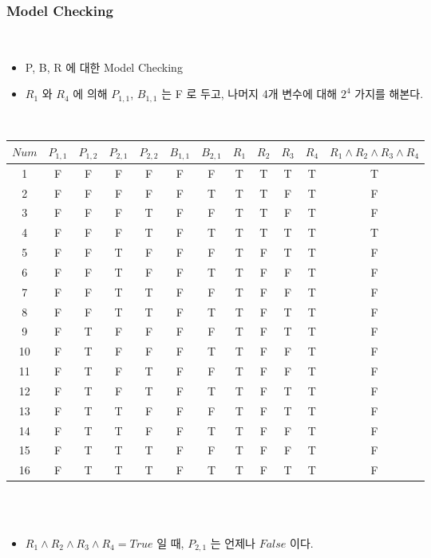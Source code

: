 \documentclass[a4paper]{article}
\begin{document}
\subsubsection{Model Checking} %
~~~~~~\begin{itemize}
    \item P, B, R 에 대한 Model Checking
    \item $R_1$ 와 $R_4$ 에 의해 $P_{1, 1}$, $B_{1,1}$ 는 F 로 두고, 나머지 4개 변수에 대해 $2^4$ 가지를 해본다.
\end{itemize}
~~~~~~~~\begin{tabular}{@{}ccccccc|cccc|c@{}}
\toprule
$Num$ & $P_{1, 1}$ & $P_{1, 2}$ & $P_{2, 1}$ & $P_{2, 2}$ & $B_{1, 1}$ & $B_{2, 1}$ & $R_1$ & $R_2$ & $R_3$ & $R_4$ & $R_1 \land R_2 \land R_3 \land R_4$\\  
\midrule
 1 & F & F & F & F & F & F & T & T & T & T & T \\
 2 & F & F & F & F & F & T & T & T & F & T & F \\
 3 & F & F & F & T & F & F & T & T & F & T & F \\
 4 & F & F & F & T & F & T & T & T & T & T & T \\
 5 & F & F & T & F & F & F & T & F & T & T & F \\
 6 & F & F & T & F & F & T & T & F & F & T & F \\
 7 & F & F & T & T & F & F & T & F & F & T & F \\
 8 & F & F & T & T & F & T & T & F & T & T & F \\
 9 & F & T & F & F & F & F & T & F & T & T & F \\
10 & F & T & F & F & F & T & T & F & F & T & F \\
11 & F & T & F & T & F & F & T & F & F & T & F \\
12 & F & T & F & T & F & T & T & F & T & T & F \\
13 & F & T & T & F & F & F & T & F & T & T & F \\
14 & F & T & T & F & F & T & T & F & F & T & F \\
15 & F & T & T & T & F & F & T & F & F & T & F \\
16 & F & T & T & T & F & T & T & F & T & T & F \\
\bottomrule
\end{tabular} \\
~~~~~~\begin{itemize}
    \item $R_1 \land R_2 \land R_3 \land R_4 = True$ 일 때, $P_{2,1}$ 는 언제나 $False$ 이다.
\end{itemize}
\end{document}
